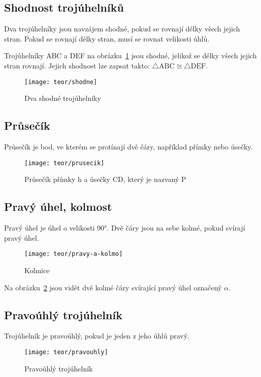\subsection{Shodnost trojúhelníků}
Dva trojúhelníky jsou navzájem shodné, pokud se rovnají délky všech jejich stran. Pokud se rovnají délky stran, musí se rovnat velikosti úhlů.

Trojúhelníky ABC a DEF na obrázku~\ref{fig:shodne} jsou shodné, jelikož se délky všech jejich stran rovnají. Jejich shodnost lze zapsat takto: $\triangle\text{ABC} \cong \triangle\text{DEF}$.

\begin{figure}[h]
	\centering
	\texttt{[image: teor/shodne]}
	\caption{Dva shodné trojúhelníky}
	\label{fig:shodne}
\end{figure}
\FloatBarrier

\subsection{Průsečík}
Průsečík je bod, ve kterém se protínají dvě čáry, například přímky nebo úsečky.

\begin{figure}[h]
    \centering
    \texttt{[image: teor/prusecik]}
    \caption{Průsečík přímky h a úsečky CD, který je nazvaný P}
\end{figure}
\FloatBarrier

\subsection{Pravý úhel, kolmost}
Pravý úhel je úhel o velikosti 90°. Dvě čáry jsou na sebe kolmé, pokud svírají pravý úhel.

\begin{figure}[h]
    \centering
    \texttt{[image: teor/pravy-a-kolmo]}
    \caption{Kolmice}
    \label{fig:kolm}
\end{figure}
\FloatBarrier

Na obrázku~\ref{fig:kolm} jsou vidět dvě kolmé čáry svírající pravý úhel označený $\alpha$.

\subsection{Pravoúhlý trojúhelník}
Trojúhelník je pravoúhlý, pokud je jeden z jeho úhlů pravý.

\begin{figure}[!h]
    \centering
    \texttt{[image: teor/pravouhly]}
    \caption{Pravoúhlý trojúhelník}
    \label{fig:pravouhly_troj}
\end{figure}
\FloatBarrier

